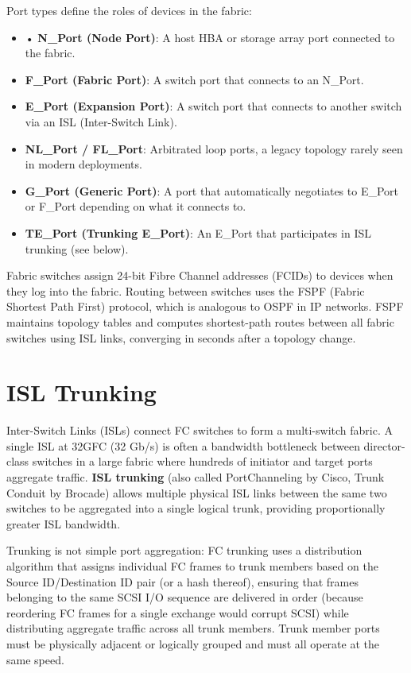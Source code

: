 Port types define the roles of devices in the fabric:

\begin{itemize}
  \item • \textbf{N\_Port (Node Port)}: A host HBA or storage array port connected to the fabric.
  \item \textbf{F\_Port (Fabric Port)}: A switch port that connects to an N\_Port.
  \item \textbf{E\_Port (Expansion Port)}: A switch port that connects to another switch via an ISL (Inter-Switch Link).
  \item \textbf{NL\_Port / FL\_Port}: Arbitrated loop ports, a legacy topology rarely seen in modern deployments.
  \item \textbf{G\_Port (Generic Port)}: A port that automatically negotiates to E\_Port or F\_Port depending on what it connects to.
  \item \textbf{TE\_Port (Trunking E\_Port)}: An E\_Port that participates in ISL trunking (see below).
\end{itemize}

Fabric switches assign 24-bit Fibre Channel addresses (FCIDs) to devices when they log into the fabric. Routing between switches uses the FSPF (Fabric Shortest Path First) protocol, which is analogous to OSPF in IP networks. FSPF maintains topology tables and computes shortest-path routes between all fabric switches using ISL links, converging in seconds after a topology change.

\section{ISL Trunking}
Inter-Switch Links (ISLs) connect FC switches to form a multi-switch fabric. A single ISL at 32GFC (32 Gb/s) is often a bandwidth bottleneck between director-class switches in a large fabric where hundreds of initiator and target ports aggregate traffic. \textbf{ISL trunking} (also called PortChanneling by Cisco, Trunk Conduit by Brocade) allows multiple physical ISL links between the same two switches to be aggregated into a single logical trunk, providing proportionally greater ISL bandwidth.

Trunking is not simple port aggregation: FC trunking uses a distribution algorithm that assigns individual FC frames to trunk members based on the Source ID/Destination ID pair (or a hash thereof), ensuring that frames belonging to the same SCSI I/O sequence are delivered in order (because reordering FC frames for a single exchange would corrupt SCSI) while distributing aggregate traffic across all trunk members. Trunk member ports must be physically adjacent or logically grouped and must all operate at the same speed.

